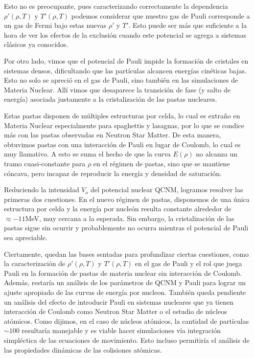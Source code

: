 Esto no es preocupante, pues caracterizando correctamente la dependencia $\rho'(\rho, T)$ y $T'(\rho, T)$ podemos considerar que nuestro gas de Pauli corresponde a un gas de Fermi bajo estas 
nuevas $\rho'$ y $T'$.
Esto puede ser más que suficiente a la hora de ver los efectos de la exclusión cuando este potencial se agrega a sistemas clásicos ya conocidos.

Por otro lado, vimos que el potencial de Pauli impide la formación de cristales en sistemas densos, dificultando que las partículas alcancen energías cinéticas bajas.
Esto no solo se apreció en el gas de Pauli, sino también en las simulaciones de Materia Nuclear.
Allí vimos que desaparece la transición de fase (y salto de energía) asociada justamente a la cristalización de las pastas nucleares.

Estas pastas disponen de múltiples estructuras por celda, lo cual es extraño en Materia Nuclear especialmente para spaghettis y lasagnas, por lo que se condice más con las pastas observadas en Neutron Star Matter.
De esta manera, obtuvimos pastas con una interacción de Pauli en lugar de Coulomb, lo cual es muy llamativo.
A esto se suma el hecho de que la curva $E(\rho)$ no alcanza un tramo cuasi-constante para $\rho$ en el régimen de pastas, sino que se mantiene cóncava, pero incapaz de reproducir la energía y densidad de saturación.

Reduciendo la intensidad $V_o$ del potencial nuclear QCNM, logramos resolver las primeras dos cuestiones.
En el nuevo régimen de pastas, disponemos de una única estructura por celda y la energía por nucleón resulta constante alrededor de $\approx -11$MeV, muy cercana a la esperada.
Sin embargo, la cristalización de las pastas sigue sin ocurrir y probablemente no ocurra mientras el potencial de Pauli sea apreciable.

Ciertamente, quedan las bases sentadas para profundizar ciertas cuestiones, como la caracterización de $\rho'(\rho, T)$ y $T'(\rho, T)$ en el gas de Pauli y el rol que juega Pauli en la formación de pastas 
de materia nuclear sin interacción de Coulomb. 
Además, restaría un análisis de los parámetros de QCNM y Pauli para lograr un ajuste apropiado de las curvas de energía por nucleon. 
También queda pendiente un análisis del efecto de introducir Pauli en sistemas nucleares que ya tienen interacción de Coulomb como Neutron Star Matter o el estudio de núcleos atómicos. 
Como dijimos, en el caso de núcleos atómicos, la cantidad de partículas $\sim 100$ resultaría manejable y es viable hacer simulaciones vía integración simpléctica de las ecuaciones de movimiento.
Esto incluso permitiría el análisis de las propiedades dinámicas de las colisiones atómicas.